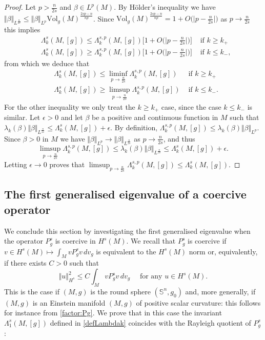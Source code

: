 \documentclass[10pt]{amsart}
\numberwithin{equation}{section}
\def\La{{\Lambda}}
\def\ep{{\varepsilon}}
\def \ep{\epsilon}
\theoremstyle{plain}
\theoremstyle{remark}
\begin{document}
\begin{proof}
Let $p > \frac{n}{2s}$ and $\beta \in L^p(M)$. By H\"older's inequality we have $\Vert \beta \Vert_{L^{\frac{n}{2s}}} \le \Vert \beta \Vert_{L^p} \text{Vol}_g(M)^{\frac{2sp-n}{np}}$. Since $\text{Vol}_g(M)^{\frac{2sp-n}{np}} = 1 +O\big(\big| p - \frac{n}{2s}\big|\big)$ as $p \to \frac{n}{2s}$ this implies 
$$\begin{aligned}
&  \La_k^{s}(M,[g]) \le  \La_k^{s,p}(M,[g])\Big[ 1 + O\big(\big| p - \frac{n}{2s}\big|\big)\Big] & \text{ if } k \ge k_{+} \\
&  \La_k^{s}(M,[g]) \ge  \La_k^{s,p}(M,[g])\Big[1 + O\big(\big| p - \frac{n}{2s}\big|\big)\Big] & \text{ if } k \le k_{-},
\end{aligned} $$
from which we deduce that 
$$\begin{aligned}
&  \La_k^{s}(M,[g]) \le  \liminf_{p \to \frac{n}{2s}} \La_k^{s,p}(M,[g]) & \text{ if } k \ge k_{+} \\
&  \La_k^{s}(M,[g]) \ge  \limsup_{p \to \frac{n}{2s}} \La_k^{s,p}(M,[g])& \text{ if } k \le k_{-}.
\end{aligned} $$
For the other inequality we only treat the $k \ge k_+$ case, since the case $k \le k_-$ is similar. Let $\ep >0$ and let $\beta$ be a positive and continuous function in $M$ such that $\lambda_k(\beta) \Vert \beta \Vert_{L^\frac{n}{2s}} \le   \La_k^{s}(M,[g]) + \ep$. By definition, $\La_k^{s,p}(M,[g]) \le \lambda_k(\beta)\Vert \beta \Vert_{L^p}$. Since $\beta >0$ in $M$ we have $\Vert \beta \Vert_{L^p} \to \Vert \beta \Vert_{L^{\frac{n}{2s}}}$ as $p \to \frac{n}{2s}$, and thus 
$$   \limsup_{p \to \frac{n}{2s}}  \La_k^{s,p}(M,[g]) \le \lambda_k(\beta) \Vert \beta \Vert_{L^{\frac{n}{2s}}} \le  \La_k^{s}(M,[g]) + \ep. $$
Letting $\ep \to 0$ proves that $   \limsup_{p \to \frac{n}{2s}}  \La_k^{s,p}(M,[g]) \le  \La_k^{s}(M,[g])$. %
\end{proof}




\subsection{The first generalised eigenvalue of a coercive operator}



We conclude this section by investigating the first generalised eigenvalue when the operator  $P_g^s$ is coercive in $H^s(M)$. We recall that $P_g^s$ is coercive if $v \in H^s(M) \mapsto \int_M v P_g^s v \, dv_g$ is equivalent to the $H^s(M)$ norm or, equivalently, if there exists $C >0$ such that 
\begin{equation} \label{def:coercivite}
\Vert u \Vert_{H^s}^2 \le C \int_M v P_g^s v \, dv_g  \quad \text{ for any } u \in H^s(M).
\end{equation} 
This is the case if $(M,g)$ is the round sphere $(\mathbb{S}^n, g_0)$ and, more generally, if $(M,g)$ is an Einstein manifold $(M,g)$ of positive scalar curvature: this follows for instance from  \eqref{factor:Pg}. We prove that in this case the invariant $\Lambda_1^s(M,[g])$ defined in \eqref{defLambdak} coincides with the Rayleigh quotient of $P_g^s$:
\end{document}
